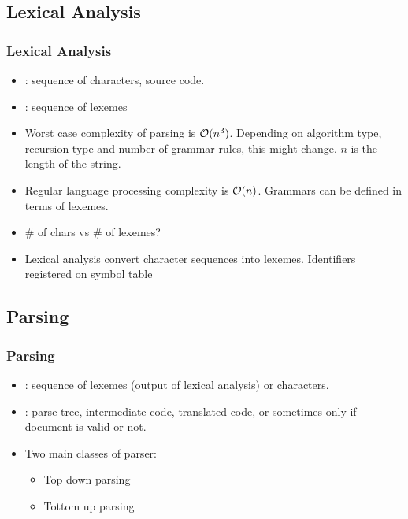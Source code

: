\subsection{Lexical Analysis}
\begin{frame}
\frametitle{Lexical Analysis}
\begin{itemize}
\item {}: sequence of characters, source code.
\item {}: sequence of lexemes
\item Worst case complexity of parsing is ${\cal O}(n^3)$.
	Depending on algorithm type, recursion type and number of
	grammar rules, this might change. $n$ is the length of the string.
\item Regular language processing complexity is ${\cal O}(n)$. Grammars can be 
	defined in terms of lexemes.
\item \# of chars vs \# of lexemes? 
\item Lexical analysis convert character sequences into lexemes. Identifiers
	registered on symbol table
\end{itemize}
\end{frame}

\subsection{Parsing}
\begin{frame}
\frametitle{Parsing}
\begin{itemize}
\item {}: sequence of lexemes (output of lexical analysis) or characters.
\item {}: parse tree, intermediate code, translated code, or sometimes only if document is valid or not.
\item Two main classes of parser:
	\begin{itemize}
	\item Top down parsing
	\item Tottom up parsing
	\end{itemize}
\end{itemize}
\end{frame}

